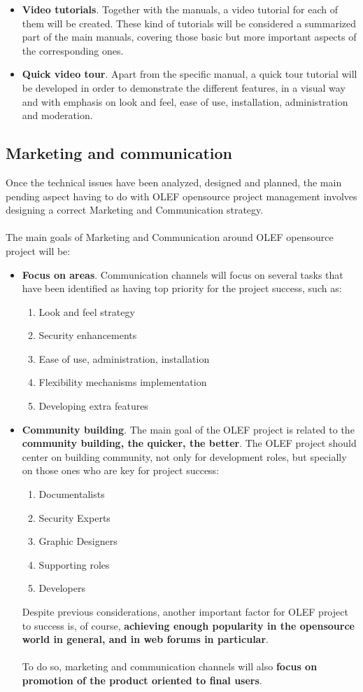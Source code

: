 \documentclass[11pt]{article}
\begin{document}
\begin{itemize}
\item{\textbf{Video tutorials}}. Together with the manuals, a video tutorial for each of them will be created. These kind of tutorials will be considered a summarized part of the main manuals, covering those basic but more important aspects of the corresponding ones.
\item{\textbf{Quick video tour}}. Apart from the specific manual, a quick tour tutorial will be developed in order to demonstrate the different features, in a visual way and with emphasis on look and feel, ease of use, installation, administration and moderation.
\end{itemize}
\subsection{Marketing and communication}
Once the technical issues have been analyzed, designed and planned, the main pending aspect having to do with OLEF opensource project management involves designing a correct Marketing and Communication strategy.\\
\\
The main goals of Marketing and Communication around OLEF opensource project will be:
\begin{itemize}\itemsep0pt
\item{\textbf{Focus on areas}}. Communication channels will focus on several tasks that have been identified as having top priority for the project success, such as:
\begin{enumerate}\itemsep0pt
\item{Look and feel strategy}
\item{Security enhancements}
\item{Ease of use, administration, installation}
\item{Flexibility mechanisms implementation}
\item{Developing extra features}
\end{enumerate}
\item{\textbf{Community building}}. The main goal of the OLEF project is related to the \textbf{community building, the quicker, the better}. The OLEF project should center on building community, not only for development roles, but specially on those ones who are key for project success:
\begin{enumerate}\itemsep0pt
\item{Documentalists}
\item{Security Experts}
\item{Graphic Designers}
\item{Supporting roles}
\item{Developers}
\end{enumerate}
Despite previous considerations, another important factor for OLEF project to success is, of course, \textbf{achieving enough popularity in the opensource world in general, and in web forums in particular}.\\
\\
To do so, marketing and communication channels will also \textbf{focus on promotion of the product oriented to final users}.
\end{itemize}
\end{document}
